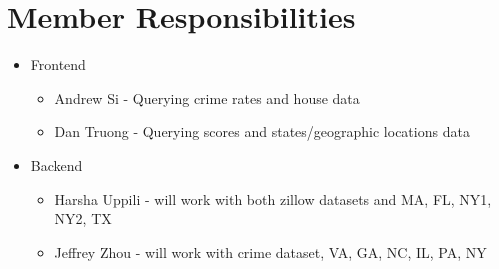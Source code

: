 \documentclass{article}
\begin{document}
\section*{Member Responsibilities}
\begin{itemize}
    \item Frontend
    \begin{itemize}
        \item Andrew Si - Querying crime rates and house data
        \item Dan Truong - Querying scores and states/geographic locations data
    \end{itemize}
    \item Backend
    \begin{itemize}
        \item Harsha Uppili - will work with both zillow datasets and MA, FL, NY1, NY2, TX
        \item Jeffrey Zhou - will work with crime dataset, VA, GA, NC, IL, PA, NY    
    \end{itemize}
\end{itemize}
\end{document}

